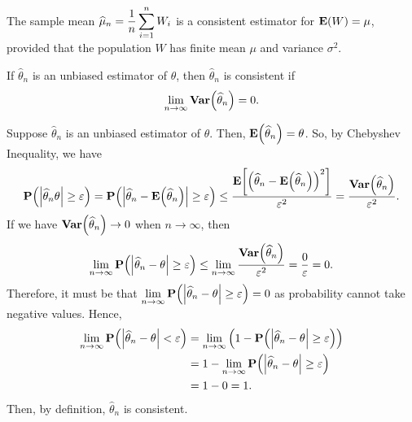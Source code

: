 \begin{cor}{}
	The sample mean $\widehat\mu_n=\dfrac{1}{n}\displaystyle\sum_{i=1}^nW_i$ is a consistent estimator for $\vb{E}(W)=\mu$, provided that the population $W$ has finite mean $\mu$ and variance $\sigma^2$.	
\end{cor}
\begin{prop}{}
	If $\hat\theta_n$ is an unbiased estimator of $\theta$, then $\hat\theta_n$ is consistent if \[\lim_{n\to\infty}\vb{Var}\qty(\widehat\theta_n)=0.\]	
\end{prop}
\begin{prf}
	Suppose $\hat\theta_n$ is an unbiased estimator of $\theta$. Then, $\vb{E}\qty(\widehat\theta_n)=\theta$. So, by Chebyshev Inequality, we have \[\vb{P}\qty(\abs{\widehat\theta_n\theta}\geq\varepsilon)=\vb{P}\qty(\abs{\widehat\theta_n-\vb{E}\qty(\widehat\theta_n)}\geq\varepsilon)\leq\dfrac{\vb{E}\qty[\qty(\widehat\theta_n-\vb{E}\qty(\widehat\theta_n))^2]}{\varepsilon^2}=\dfrac{\vb{Var}\qty(\widehat\theta_n)}{\varepsilon^2}.\] If we have $\vb{Var}\qty(\widehat\theta_n)\to0$ when $n\to\infty$, then \[\lim_{n\to\infty}\vb{P}\qty(\abs{\widehat\theta_n-\theta}\geq\varepsilon)\leq\lim_{n\to\infty}\dfrac{\vb{Var}\qty(\widehat\theta_n)}{\varepsilon^2}=\dfrac{0}{\varepsilon}=0.\] Therefore, it must be that $\displaystyle\lim_{n\to\infty}\vb{P}\qty(\abs{\widehat\theta_n-\theta}\geq\varepsilon)=0$ as probability cannot take negative values. Hence, \begin{align*}\lim_{n\to\infty}\vb{P}\qty(\abs{\widehat\theta_n-\theta}<\varepsilon)&=\lim_{n\to\infty}\qty(1-\vb{P}\qty(\abs{\widehat\theta_n-\theta}\geq\varepsilon))\\&=1-\lim_{n\to\infty}\vb{P}\qty(\abs{\widehat\theta_n-\theta}\geq\varepsilon)\\&=1-0=1.\end{align*} Then, by definition, $\hat\theta_n$ is consistent. 
\end{prf}


